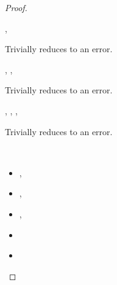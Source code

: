 \begin{lemma}
\begin{proof}
\begin{case}[B-DefMethod]
\begin{itemize}
\begin{subcase}[T-DefMethod]
      \end{subcase}

  \end{itemize}
\end{case}

      \begin{case}[BE-DefMethod1]
        \opsem {\openv{}}
               {}
               {\errorval{\val{}}},
        \opsem {\openv{}}
                  {\e{}}
                {\errorval{\val{}}}

                Trivially reduces to an error.

      \end{case}
      \begin{case}[BE-DefMethod2]
        \opsem {\openv{}}
         {}
         { {\disptable{}}},
  \opsem {\openv{}}
         {}
         {\errorval{\val{}}},
        \opsem {\openv{}}
                  {\e{}}
                {\errorval{\val{}}}

                Trivially reduces to an error.
      \end{case}
      \begin{case}[BE-DefMethod3]
        \opsem {\openv{}}
         {}
         { {\disptable{}}},
  \opsem {\openv{}}
         {}
         {},
  \opsem {\openv{}}
         {}
         {\errorval{\val{}}},
        \opsem {\openv{}}
                  {\e{}}
                {\errorval{\val{}}}

                Trivially reduces to an error.

      \end{case}

\begin{case}[B-BetaClosure]
  \ 

  \begin{itemize}
    \item
  \opsem{\openv{}}{\e{}}{\val{}},
    \item
  \opsem {\openv{}}
         {}
         { {\abs {\x{}} {\s{}} {}}},
    \item
  \opsem {\openv{}}
         {}
         {},
    \item
         {}
         {\val{}}
     \end{itemize}


\begin{itemize}
  \item[]
\begin{subcase}[T-App]
  \ 


\end{subcase}
\end{itemize}
\end{case}
\end{proof}
\end{lemma}
